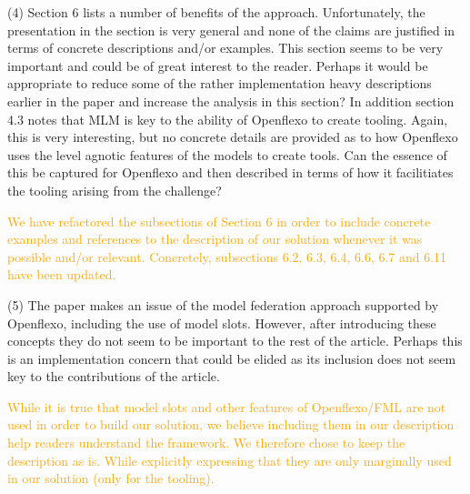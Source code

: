 \documentclass[10pt]{article}
\begin{document}
\begin{response}{(4) Section 6 lists a number of benefits of the approach. Unfortunately, the presentation in the section is very general and none of the claims are justified in terms of concrete descriptions and/or examples. This section seems to be very important and could be of great interest to the reader. Perhaps it would be appropriate to reduce some of the rather implementation heavy descriptions earlier in the paper and increase the analysis in this section? In addition section 4.3 notes that MLM is key to the ability of Openflexo to create tooling. Again, this is very interesting, but no concrete details are provided as to how Openflexo uses the level agnotic features of the models to create tools. Can the essence of this be captured for Openflexo and then described in terms of how it facilitiates the tooling arising from the challenge?}

\textcolor{orange}{We have refactored the subsections of Section 6 in order to include concrete examples and references to the description of our solution whenever it was possible and/or relevant. Concretely, subsections 6.2, 6.3, 6.4, 6.6, 6.7 and 6.11 have been updated.}


\end{response}

\begin{response}{(5) The paper makes an issue of the model federation approach supported by Openflexo, including the use of model slots. However, after introducing these concepts they do not seem to be important to the rest of the article. Perhaps this is an implementation concern that could be elided as its inclusion does not seem key to the contributions of the article. }

\textcolor{orange}{While it is true that model slots and other features of Openflexo/FML are not used in order to build our solution,  we believe including them in our description help readers understand the framework. We therefore chose to keep the description as is. While explicitly expressing that they are only marginally used in our solution (only for the tooling).}
\end{response}
\end{document}
